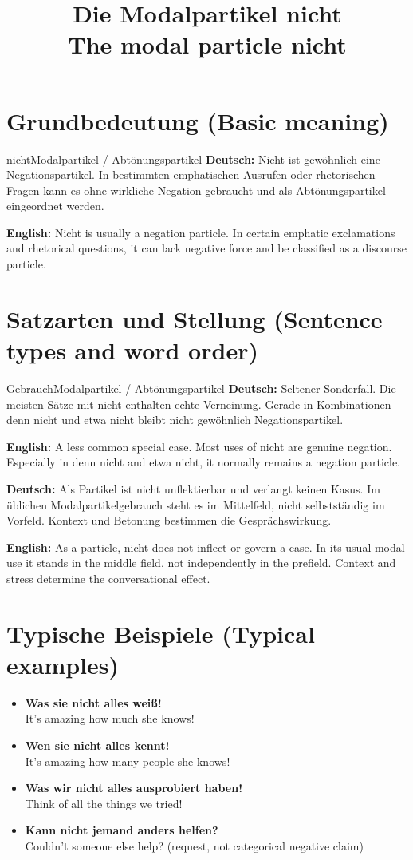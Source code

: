 \documentclass[a4paper,11pt]{article}
\title{Die Modalpartikel \glqq nicht\grqq\\{\large\textnormal{The modal particle nicht}}}
\date{}
\newcommand{\GermanText}[1]{\textbf{Deutsch: }#1\par}
\newcommand{\EnglishText}[1]{{\small\color{SoftGray}\textbf{English: }#1\par}}
\newcommand{\ExampleItem}[2]{\item \textbf{#1}\\{\small\color{SoftGray}#2}}
\begin{document}
\maketitle
\tableofcontents
\section{Grundbedeutung \textnormal{(Basic meaning)}}
\begin{grammarentry}{nicht}{Modalpartikel / Abtönungspartikel}
\GermanText{Nicht ist gewöhnlich eine Negationspartikel. In bestimmten emphatischen Ausrufen oder rhetorischen Fragen kann es ohne wirkliche Negation gebraucht und als Abtönungspartikel eingeordnet werden.}
\EnglishText{Nicht is usually a negation particle. In certain emphatic exclamations and rhetorical questions, it can lack negative force and be classified as a discourse particle.}
\end{grammarentry}
\section{Satzarten und Stellung \textnormal{(Sentence types and word order)}}
\begin{grammarentry}{Gebrauch}{Modalpartikel / Abtönungspartikel}
\GermanText{Seltener Sonderfall. Die meisten Sätze mit nicht enthalten echte Verneinung. Gerade in Kombinationen denn nicht und etwa nicht bleibt nicht gewöhnlich Negationspartikel.}
\EnglishText{A less common special case. Most uses of nicht are genuine negation. Especially in denn nicht and etwa nicht, it normally remains a negation particle.}
\end{grammarentry}
\GermanText{Als Partikel ist nicht unflektierbar und verlangt keinen Kasus. Im üblichen Modalpartikelgebrauch steht es im Mittelfeld, nicht selbstständig im Vorfeld. Kontext und Betonung bestimmen die Gesprächswirkung.}
\EnglishText{As a particle, nicht does not inflect or govern a case. In its usual modal use it stands in the middle field, not independently in the prefield. Context and stress determine the conversational effect.}
\section{Typische Beispiele \textnormal{(Typical examples)}}
\begin{exbox}\begin{itemize}
\ExampleItem{Was sie nicht alles weiß!}{It's amazing how much she knows!}
\ExampleItem{Wen sie nicht alles kennt!}{It's amazing how many people she knows!}
\ExampleItem{Was wir nicht alles ausprobiert haben!}{Think of all the things we tried!}
\ExampleItem{Kann nicht jemand anders helfen?}{Couldn't someone else help? (request, not categorical negative claim)}
\end{itemize}\end{exbox}
\end{document}
